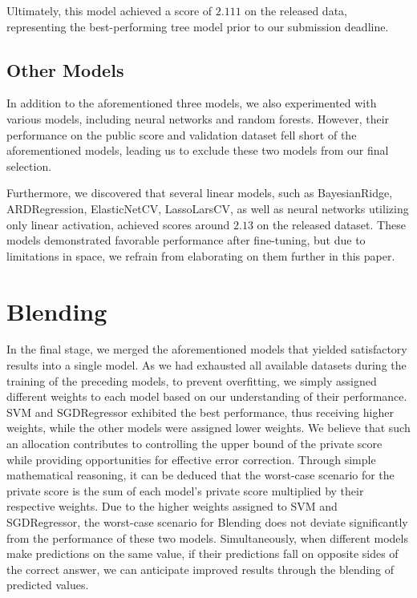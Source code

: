\documentclass[10pt,letterpaper]{article}
\begin{document}
Ultimately, this model achieved a score of $2.111$ on the released data, 
representing the best-performing tree model prior to our submission deadline.

\subsection{Other Models}

In addition to the aforementioned three models, we also experimented with various models, 
including neural networks and random forests. 
However, their performance on the public score and validation dataset fell short of the aforementioned models, 
leading us to exclude these two models from our final selection.

Furthermore, we discovered that several linear models, 
such as BayesianRidge, ARDRegression, ElasticNetCV, LassoLarsCV, as well as neural networks utilizing only linear activation, 
achieved scores around $2.13$ on the released dataset. 
These models demonstrated favorable performance after fine-tuning, 
but due to limitations in space, we refrain from elaborating on them further in this paper.

\section{Blending}

In the final stage, we merged the aforementioned models that yielded satisfactory results into a single model. 
As we had exhausted all available datasets during the training of the preceding models, 
to prevent overfitting, we simply assigned different weights to each model based on our understanding of their performance. 
SVM and SGDRegressor exhibited the best performance, thus receiving higher weights, 
while the other models were assigned lower weights. 
We believe that such an allocation contributes to controlling the upper bound of the private score while providing opportunities for effective error correction. 
Through simple mathematical reasoning, 
it can be deduced that the worst-case scenario for the private score is the sum of each model's private score multiplied by their respective weights. 
Due to the higher weights assigned to SVM and SGDRegressor, the worst-case scenario for Blending does not deviate significantly from the performance of these two models. 
Simultaneously, when different models make predictions on the same value, 
if their predictions fall on opposite sides of the correct answer, 
we can anticipate improved results through the blending of predicted values.
\end{document}
